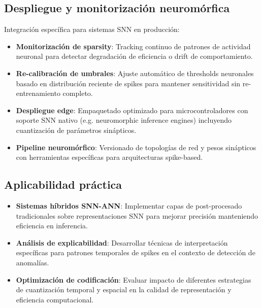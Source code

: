 \subsection{Despliegue y monitorización neuromórfica}
Integración específica para sistemas SNN en producción:
\begin{itemize}
    \item \textbf{Monitorización de sparsity}: Tracking continuo de patrones de actividad neuronal para detectar degradación de eficiencia o drift de comportamiento.
    \item \textbf{Re-calibración de umbrales}: Ajuste automático de thresholds neuronales basado en distribución reciente de spikes para mantener sensitividad sin re-entrenamiento completo.
    \item \textbf{Despliegue edge}: Empaquetado optimizado para microcontroladores con soporte SNN nativo (e.g. neuromorphic inference engines) incluyendo cuantización de parámetros sinápticos.
    \item \textbf{Pipeline neuromórfico}: Versionado de topologías de red y pesos sinápticos con herramientas específicas para arquitecturas spike-based.
\end{itemize}

\subsection{Aplicabilidad práctica}
\begin{itemize}
    \item \textbf{Sistemas híbridos SNN-ANN}: Implementar capas de post-procesado tradicionales sobre representaciones SNN para mejorar precisión manteniendo eficiencia en inferencia.
    \item \textbf{Análisis de explicabilidad}: Desarrollar técnicas de interpretación específicas para patrones temporales de spikes en el contexto de detección de anomalías.
    \item \textbf{Optimización de codificación}: Evaluar impacto de diferentes estrategias de cuantización temporal y espacial en la calidad de representación y eficiencia computacional.
\end{itemize}
